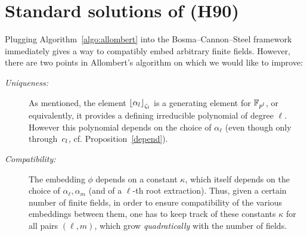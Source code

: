 \documentclass{sig-alternate}
\begin{document}
\section{Standard solutions of (H90)}
\label{sec:compatibleH90}

Plugging Algorithm~\ref{algo:allombert} into the Bosma--Cannon--Steel
framework immediately gives a way to compatibly embed arbitrary finite
fields. %
However, there are two points in Allombert's algorithm on which we
would like to improve:
\begin{description}
\item[\emph{Uniqueness:}] As mentioned, the element $\left\lfloor \alpha_{l} \right\rfloor_{\zeta_l}$ is a generating element for $\mathbb{F}_{p^{l}}$,
or equivalently, it provides a defining irreducible polynomial of degree $\ell$.
However this polynomial depends on the choice of $\alpha_{\ell}$
(even though only through~$c_l$, cf. Proposition~\ref{depend}).
\item[\emph{Compatibility:}] The embedding $\phi$ depends on a constant $\kappa$,
which itself depends on the choice of $\alpha_\ell,\alpha_m$ (and of a $\ell$-th root extraction).
Thus, given a certain number of finite fields, in order to ensure compatibility of the various
embeddings between them, one has to keep track of these constants $\kappa$
for all pairs $(\ell,m)$,
which grow \emph{quadratically} with the number of fields.
\end{description}
\end{document}
